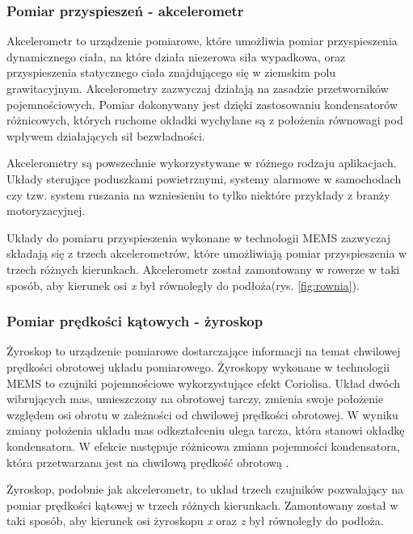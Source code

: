 \subsubsection{Pomiar przyspieszeń - akcelerometr}
Akcelerometr to urządzenie pomiarowe, które umożliwia pomiar przyspieszenia dynamicznego ciała, na które działa niezerowa siła wypadkowa, oraz przyspieszenia statycznego ciała znajdującego się w ziemskim polu grawitacyjnym. Akcelerometry zazwyczaj działają na zasadzie przetworników pojemnościowych. Pomiar dokonywany jest dzięki zastosowaniu kondensatorów różnicowych, których ruchome okładki wychylane są z położenia równowagi pod wpływem działających sił bezwładności.

Akcelerometry są powszechnie wykorzystywane w różnego rodzaju aplikacjach. Układy sterujące poduszkami powietrznymi, systemy alarmowe w samochodach czy tzw. system ruszania na wzniesieniu to tylko niektóre przykłady z branży motoryzacyjnej\cite{stAkcel}.

Układy do pomiaru przyspieszenia wykonane w technologii MEMS zazwyczaj składają się z trzech akcelerometrów, które umożliwiają pomiar przyspieszenia w trzech różnych kierunkach. Akcelerometr został zamontowany w rowerze w taki sposób, aby kierunek osi \textit{x} był równoległy do podłoża(rys. \ref{fig:rownia}).
\subsubsection{Pomiar prędkości kątowych - żyroskop}
Żyroskop to urządzenie pomiarowe dostarczające informacji na temat chwilowej prędkości obrotowej układu pomiarowego. Żyroskopy wykonane w technologii MEMS to czujniki pojemnościowe wykorzystujące efekt Coriolisa. Układ dwóch wibrujących mas, umieszczony na obrotowej tarczy, zmienia swoje położenie względem osi obrotu w zależności od chwilowej prędkości obrotowej. W wyniku zmiany położenia układu mas odkształceniu ulega tarcza, która stanowi okładkę kondensatora. W efekcie następuje różnicowa zmiana pojemności kondensatora, która przetwarzana jest na chwilową prędkość obrotową \cite{stGyro}.

Żyroskop, podobnie jak akcelerometr, to układ trzech czujników pozwalający na pomiar prędkości kątowej w trzech różnych kierunkach. Zamontowany został w taki sposób, aby kierunek osi żyroskopu \textit{x} oraz \textit{z}  był równoległy do podłoża.

